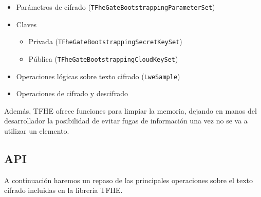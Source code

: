 \begin{itemize}
  \item Parámetros de cifrado (\verb|TFheGateBootstrappingParameterSet|)
  \item Claves
  \begin{itemize}
      \item Privada (\verb|TFheGateBootstrappingSecretKeySet|)
      \item Pública (\verb|TFheGateBootstrappingCloudKeySet|)
  \end{itemize}
  \item Operaciones lógicas sobre texto cifrado (\verb|LweSample|)
  \item Operaciones de cifrado y descifrado
\end{itemize}

Además, TFHE ofrece funciones para limpiar la memoria, dejando en manos del desarrollador la posibilidad de evitar fugas de información una vez no se va a utilizar un elemento.

\subsection{API}

A continuación haremos un repaso de las principales operaciones sobre el texto cifrado incluidas en la librería TFHE.

